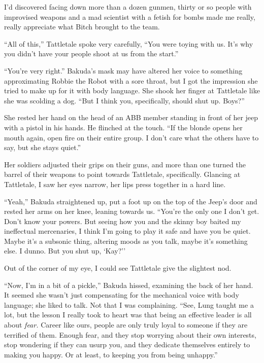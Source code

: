 





I'd discovered facing down more than a dozen gunmen, thirty or so people with improvised weapons and a mad scientist with a fetish for bombs made me really, really appreciate what Bitch brought to the team.



``All of this,'' Tattletale spoke very carefully, ``You were toying with us.  It's why you didn't have your people shoot at us from the start.''



``You're very right.'' Bakuda's mask may have altered her voice to something approximating Robbie the Robot with a sore throat, but I got the impression she tried to make up for it with body language.  She shook her finger at Tattletale like she was scolding a dog.  ``But I think you, specifically, should shut up.  Boys?''



She rested her hand on the head of an ABB member standing in front of her jeep with a pistol in his hands.  He flinched at the touch.  ``If the blonde opens her mouth again, open fire on their entire group.  I don't care what the others have to say, but she stays quiet.''



Her soldiers adjusted their grips on their guns, and more than one turned the barrel of their weapons to point towards Tattletale, specifically.  Glancing at Tattletale, I saw her eyes narrow, her lips press together in a hard line.



``Yeah,'' Bakuda straightened up, put a foot up on the top of the Jeep's door and rested her arms on her knee, leaning towards us. ``You're the only one I don't get.  Don't know your powers.  But seeing how you and the skinny boy baited my ineffectual mercenaries, I think I'm going to play it safe and have you be quiet.  Maybe it's a subsonic thing, altering moods as you talk, maybe it's something else.  I dunno.  But you shut up, `Kay?''



Out of the corner of my eye, I could see Tattletale give the slightest nod.



``Now, I'm in a bit of a pickle,'' Bakuda hissed, examining the back of her hand.  It seemed she wasn't just compensating for the mechanical voice with body language; she liked to talk.  Not that I was complaining.  ``See, Lung taught me a lot, but the lesson I really took to heart was that being an effective leader is all about \emph{fear.}  Career like ours, people are only truly loyal to someone if they are terrified of them.  Enough fear, and they stop worrying about their own interests, stop wondering if they can usurp you, and they dedicate themselves entirely to making you happy.  Or at least, to keeping you from being unhappy.''



